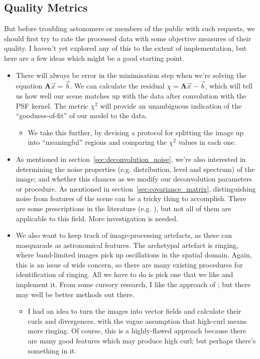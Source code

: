 \documentclass[letterpaper, 11pt]{article}
\begin{document}
\subsection{Quality Metrics}
\label{sec:quality_metric}

But before troubling astonomers or members of the public with such requests, we should first try to rate the processed data with some objective measures of their quality. I haven't yet explored any of this to the extent of implementation, but here are a few ideas which might be a good starting point.
\begin{itemize}
	\item There will always be error in the minimisation step when we're solving the equation $\mathbf A \vec x = \vec b$. We can calculate the residual $\chi = \mathbf A \vec x - \vec b$, which will tell us how well our scene matches up with the data after convolution with the PSF kernel. The metric $\chi^2$ will provide an unambiguous indication of the ``goodness-of-fit'' of our model to the data.
	\begin{itemize}
		\item We take this further, by devising a protocol for splitting the image up into ``meaningful'' regions and comparing the $\chi^2$ values in each one.
	\end{itemize}
	
	\item As mentioned in section~\ref{sec:deconvolution_noise}, we're also interested in determining the noise properties (e.g. distribution, level and spectrum) of the image; and whether this chances as we modify our deconvolution parameters or procedure. As mentioned in section~\ref{sec:covariance_matrix}, distinguishing noise from features of the scene can be a tricky thing to accomplish. There are some prescriptions in the literature (e.g. \citet{L+M08, Moi07}), but not all of them are applicable to this field. More investigation is needed.
	
	\item We also want to keep track of image-processing artefacts, as these can masquarade as astronomical features. The archetypal artefact is ringing, where band-limited images pick up oscillations in the spatial domain. Again, this is an issue of wide concern, so there are many existing procedures for identification of ringing. All we have to do is pick one that we like and implement it. From some cursory research, I like the approach of \citet{BMR10}; but there may well be better methods out there.
	\begin{itemize}
		\item I had an idea to turn the images into vector fields and calculate their curls and divergences, with the vague assumption that high-curl means more ringing. Of course, this is a highly-flawed approach because there are many good features which may produce high curl; but perhaps there's something in it.
	\end{itemize}
	

\end{itemize}
\end{document}

